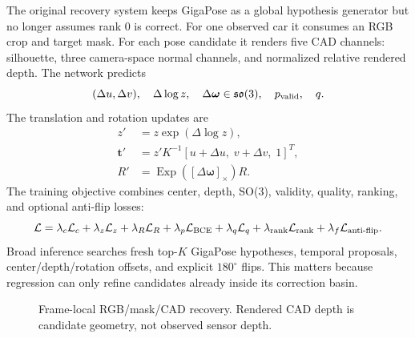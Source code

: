 \documentclass[11pt]{article}
\newcommand{\unitdeg}{^{\circ}}
\begin{document}
The original recovery system keeps GigaPose as a global hypothesis generator but no longer assumes rank 0 is correct.  For one observed car it consumes an RGB crop and target mask.  For each pose candidate it renders five CAD channels: silhouette, three camera-space normal channels, and normalized relative rendered depth.  The network predicts
\begin{equation}
(\Delta u,\Delta v),\quad \Delta\log z,\quad
\Delta\bm\omega\in\mathfrak{so}(3),\quad p_{\rm valid},\quad q.
\end{equation}
The translation and rotation updates are
\begin{align}
z'&=z\exp(\Delta\log z),\\
\bm t'&=z'K^{-1}[u+\Delta u,\;v+\Delta v,\;1]^T,\\
R'&=\operatorname{Exp}([\Delta\bm\omega]_{\times})R.
\end{align}
The training objective combines center, depth, SO(3), validity, quality, ranking, and optional anti-flip losses:
\begin{equation}
\mathcal L=\lambda_c\mathcal L_c+\lambda_z\mathcal L_z+
\lambda_R\mathcal L_R+\lambda_p\mathcal L_{\rm BCE}+
\lambda_q\mathcal L_q+\lambda_{\rm rank}\mathcal L_{\rm rank}+
\lambda_f\mathcal L_{\rm anti\text{-}flip}.
\end{equation}
Broad inference searches fresh top-$K$ GigaPose hypotheses, temporal proposals, center/depth/rotation offsets, and explicit $180\unitdeg$ flips.  This matters because regression can only refine candidates already inside its correction basin.

\begin{figure}[H]
\centering
{}
\caption{Frame-local RGB/mask/CAD recovery.  Rendered CAD depth is candidate geometry, not observed sensor depth.}
\end{figure}
\end{document}
